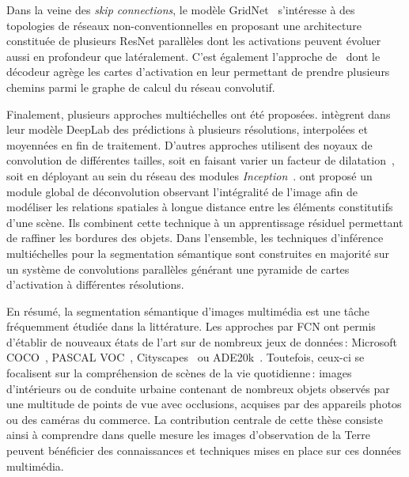Dans la veine des \emph{skip connections}, le modèle GridNet~\cite{fourure_residual_2017} s'intéresse à des topologies de réseaux non-conventionnelles en proposant une architecture constituée de plusieurs ResNet parallèles dont les activations peuvent évoluer aussi en profondeur que latéralement. C'est également l'approche de~\citet{liu_path_2018} dont le décodeur agrège les cartes d'activation en leur permettant de prendre plusieurs chemins parmi le graphe de calcul du réseau convolutif.

Finalement, plusieurs approches multiéchelles ont été proposées. \citet{chen_deeplab_2018} intègrent dans leur modèle DeepLab des prédictions à plusieurs résolutions, interpolées et moyennées en fin de traitement. D'autres approches utilisent des noyaux de convolution de différentes tailles, soit en faisant varier un facteur de dilatation~\cite{yu_multi-scale_2015}, soit en déployant au sein du réseau des modules \emph{Inception}~\cite{szegedy_going_2015,nekrasov_global_2016,zhao_pyramid_2017}. \citet{peng_large_2017} ont proposé un module global de déconvolution observant l'intégralité de l'image afin de modéliser les relations spatiales à longue distance entre les éléments constitutifs d'une scène. Ils combinent cette technique à un apprentissage résiduel permettant de raffiner les bordures des objets. Dans l'ensemble, les techniques d'inférence multiéchelles pour la segmentation sémantique sont construites en majorité sur un système de convolutions parallèles générant une pyramide de cartes d'activation à différentes résolutions.

En résumé, la segmentation sémantique d'images multimédia est une tâche fréquemment étudiée dans la littérature. Les approches par \gls{FCN} ont permis d'établir de nouveaux états de l'art sur de nombreux jeux de données\,: Microsoft COCO~\cite{lin_microsoft_2014}, PASCAL VOC~\cite{everingham_pascal_2014}, Cityscapes~\cite{cordts_cityscapes_2016} ou ADE20k~\cite{zhou_scene_2017}. Toutefois, ceux-ci se focalisent sur la compréhension de scènes de la vie quotidienne\,: images d'intérieurs ou de conduite urbaine contenant de nombreux objets observés par une multitude de points de vue avec occlusions, acquises par des appareils photos ou des caméras du commerce. La contribution centrale de cette thèse consiste ainsi à comprendre dans quelle mesure les images d'observation de la Terre peuvent bénéficier des connaissances et techniques mises en place sur ces données multimédia.

